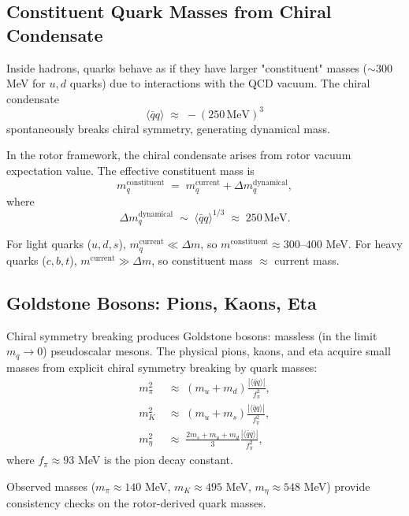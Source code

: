 \documentclass[11pt,a4paper]{article}
\theoremstyle{definition}
\theoremstyle{plain}
\theoremstyle{remark}
\begin{document}
\subsection{Constituent Quark Masses from Chiral Condensate}

Inside hadrons, quarks behave as if they have larger "constituent" masses ($\sim 300$ MeV for $u,d$ quarks) due to interactions with the QCD vacuum. The chiral condensate
\begin{equation}
\langle \bar{q}q \rangle \;\approx\; -(250\,\text{MeV})^3
\end{equation}
spontaneously breaks chiral symmetry, generating dynamical mass.

In the rotor framework, the chiral condensate arises from rotor vacuum expectation value. The effective constituent mass is
\begin{equation}
m_q^{\mathrm{constituent}} \;=\; m_q^{\mathrm{current}} + \Delta m_q^{\mathrm{dynamical}},
\end{equation}
where
\begin{equation}
\Delta m_q^{\mathrm{dynamical}} \;\sim\; \langle \bar{q}q \rangle^{1/3} \;\approx\; 250\,\text{MeV}.
\end{equation}

For light quarks ($u,d,s$), $m_q^{\mathrm{current}} \ll \Delta m$, so $m^{\mathrm{constituent}} \approx 300$--$400$ MeV. For heavy quarks ($c,b,t$), $m^{\mathrm{current}} \gg \Delta m$, so constituent mass $\approx$ current mass.

\subsection{Goldstone Bosons: Pions, Kaons, Eta}

Chiral symmetry breaking produces Goldstone bosons: massless (in the limit $m_q \to 0$) pseudoscalar mesons. The physical pions, kaons, and eta acquire small masses from explicit chiral symmetry breaking by quark masses:
\begin{align}
m_\pi^2 &\;\approx\; (m_u + m_d)\frac{|\langle\bar{q}q\rangle|}{f_\pi^2}, \\
m_K^2 &\;\approx\; (m_u + m_s)\frac{|\langle\bar{q}q\rangle|}{f_\pi^2}, \\
m_\eta^2 &\;\approx\; \frac{2m_s + m_u + m_d}{3}\frac{|\langle\bar{q}q\rangle|}{f_\pi^2},
\end{align}
where $f_\pi \approx 93$ MeV is the pion decay constant.

Observed masses ($m_\pi \approx 140$ MeV, $m_K \approx 495$ MeV, $m_\eta \approx 548$ MeV) provide consistency checks on the rotor-derived quark masses.
\end{document}

